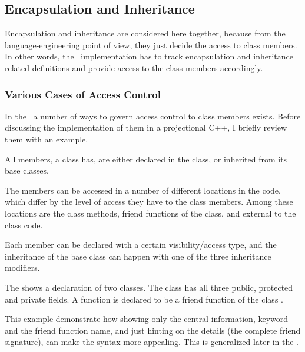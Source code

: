 \subsection{Encapsulation and Inheritance}


Encapsulation and inheritance are considered here together, because from the language-engineering point of view, 
they just decide the access to class members. In other words, the \pcpp\ implementation has to track
encapsulation and inheritance related definitions and provide access to the class members accordingly.


\subsubsection{Various Cases of Access Control}

In the \cpppl\ a number of ways to govern access control to class members exists. Before discussing 
the implementation of them in a projectional C++, I briefly review them with an example.

All members, a class has, are either declared in the class, or inherited from its base classes. 

The members can be accessed in a number of different locations in the code, which differ by the level of access they have
to the class members. Among these locations are the class methods, friend functions of the class, and
external to the class code. 

Each member can be declared with a certain visibility/access type, and the inheritance
of the base class can happen with one of the three inheritance modifiers. 



The  shows a declaration of two classes. The class  has all three
public, protected and private fields. A function  is declared to be a
friend function of  the class . 

This example demonstrate how showing only the central information,  keyword and the
friend function name, and just hinting on the details (the complete friend signature), can make 
the syntax more appealing. This is generalized later in the .


